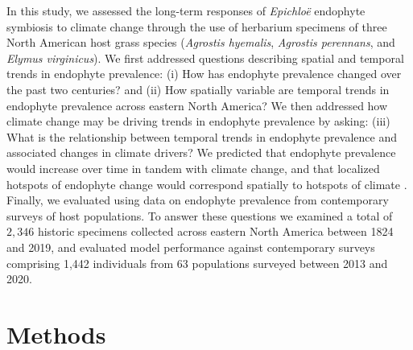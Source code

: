 \documentclass[11pt]{article}
\newcommand{\revise}[1]{{\color{black}{#1}}}
\begin{document}
In this study, we assessed the long-term responses of \emph{Epichloë} endophyte symbiosis to climate change through the use of herbarium specimens of three North American host grass species (\emph{Agrostis hyemalis}, \emph{Agrostis perennans}, and \emph{Elymus virginicus}).
We first addressed questions describing spatial and temporal trends in endophyte prevalence: (i) How has endophyte prevalence changed over the past two centuries? and (ii) How spatially variable are temporal trends in endophyte prevalence across eastern North America?
We then addressed how climate change may be driving trends in endophyte prevalence by asking: (iii) What is the relationship between temporal trends in endophyte prevalence and associated changes in climate drivers?
We predicted that \revise{overall} endophyte prevalence would increase over time in tandem with climate change, and that localized hotspots of endophyte change would correspond spatially to hotspots of climate \revise{warming and drying}. 
Finally, we evaluated \revise{(iv) how our model, built on data from historic specimens, performed in an out-of-sample test }using data on endophyte prevalence from contemporary surveys of host populations. 
To answer these questions we examined a total of $2,346$ historic specimens collected across eastern North America between 1824 and 2019, and evaluated model performance against contemporary surveys comprising 1,442 individuals from 63 populations surveyed between 2013 and 2020.
	
\section*{Methods}
\end{document}
